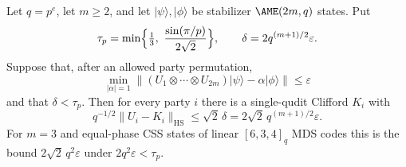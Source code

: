 \begin{proposition}
\label{prop:quantitative-intertwiner}
Let \(q=p^e\), let \(m\geq2\), and let
\(\lvert\psi\rangle,\lvert\phi\rangle\) be stabilizer \(\AME(2m,q)\)
states.  Put
\[
 \tau_p=\min\Bigl\{\tfrac13,\ \frac{\sin(\pi/p)}{2\sqrt2}\Bigr\},
 \qquad
 \delta=2q^{(m+1)/2}\varepsilon .
\]
Suppose that, after an allowed party permutation,
\[
 \min_{\lvert\alpha\rvert=1}
 \bigl\lVert(U_1\otimes\cdots\otimes U_{2m})\lvert\psi\rangle
   -\alpha\lvert\phi\rangle\bigr\rVert\leq\varepsilon
\]
and that \(\delta<\tau_p\).  Then for every party \(i\) there is a
single-qudit Clifford \(K_i\) with
\[
 q^{-1/2}\lVert U_i-K_i\rVert_{\mathrm{HS}}
  \leq\sqrt2\,\delta=2\sqrt2\,q^{(m+1)/2}\varepsilon .    \tag{5.5}
\]
For \(m=3\) and equal-phase CSS states of linear \([6,3,4]_q\) MDS codes
this is the bound \(2\sqrt2\,q^2\varepsilon\) under \(2q^2\varepsilon<\tau_p\).
\end{proposition}

